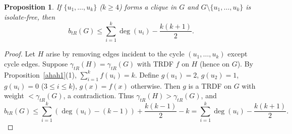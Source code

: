 \documentclass[12pt,reqno]{amsart}
\theoremstyle{plain}
\newtheorem{proposition}[theorem]{Proposition}
\numberwithin{equation}{section}
\begin{document}
\begin{proposition}
If $\{u_1, \dots, u_k\}$ ($k \geq 4$) forms a clique in $G$ and $G \setminus \{u_1, \dots, u_k\}$ is isolate-free, then
$$b_{tR}(G) \leq \sum_{i=1}^k \deg(u_i) - \frac{k(k+1)}{2}.$$
\end{proposition}
\begin{proof}
Let $H$ arise by removing edges incident to the cycle $(u_1, \dots, u_k)$ except cycle edges. Suppose $\gamma_{tR}(H) = \gamma_{tR}(G)$ with TRDF $f$ on $H$ (hence on $G$). By Proposition~\ref{ahah1}(1), $\sum_{i=1}^k f(u_i) = k$. Define $g(u_1) = 2$, $g(u_2) = 1$, $g(u_i) = 0$ ($3 \leq i \leq k$), $g(x) = f(x)$ otherwise. Then $g$ is a TRDF on $G$ with weight $< \gamma_{tR}(G)$, a contradiction. Thus $\gamma_{tR}(H) > \gamma_{tR}(G)$, and
$$b_{tR}(G) \leq \sum_{i=1}^k (\deg(u_i) - (k-1))+\frac{k(k-1)}{2}-k=\sum_{i=1}^k \deg(u_i) - \frac{k(k+1)}{2}.$$
\end{proof}
\end{document}
